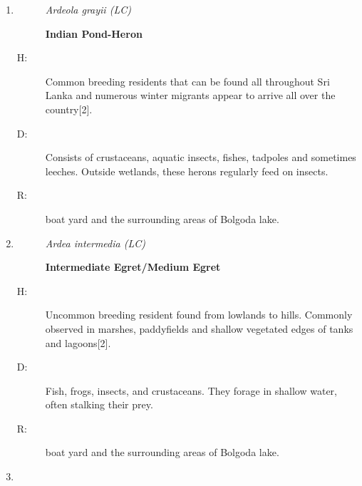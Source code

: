 \begin{itemize}
\begin{enumerate}
\begin{description}
\item[H: ]%
fairly common breeding resident in lowlands, occasionally seen on hills. Margins of lagoons,tanks paddyfields and marshes are the preferred habitat{[}2{]}.%
\item[D: ]%
Its diet primarily consists of mollusks, amphibians, aquatic insects, small reptiles, crustaceans, and occasionally other small animals. However, fish constitute the main portion of its diet.%
\item[R: ]%
boat yard and the surrounding areas of Bolgoda lake.%
\end{description}%
\item%
\begin{description}%
\item[]%
\textit{Ardeola grayii (LC)}%
\item[]%
\textbf{Indian Pond{-}Heron}%
\end{description}%
\begin{description}%
\item[H: ]%
 Common breeding residents that can be found all throughout Sri Lanka and numerous winter migrants appear to arrive all over the country{[}2{]}.%
\item[D: ]%
Consists of crustaceans, aquatic insects, fishes, tadpoles and sometimes leeches. Outside wetlands, these herons regularly feed on insects.%
\item[R: ]%
boat yard and the surrounding areas of Bolgoda lake.%
\end{description}%
\item%
\begin{description}%
\item[]%
\textit{Ardea intermedia (LC)}%
\item[]%
\textbf{Intermediate Egret/Medium Egret}%
\end{description}%
\begin{description}%
\item[H: ]%
Uncommon breeding resident found from lowlands to hills. Commonly observed in marshes, paddyfields and shallow vegetated edges of tanks and lagoons{[}2{]}.%
\item[D: ]%
Fish, frogs, insects, and crustaceans. They forage in shallow water, often stalking their prey.%
\item[R: ]%
boat yard and the surrounding areas of Bolgoda lake.%
\end{description}%
\item%
\begin{description}%
\item[]%

\end{description}
\end{enumerate}
\end{itemize}
